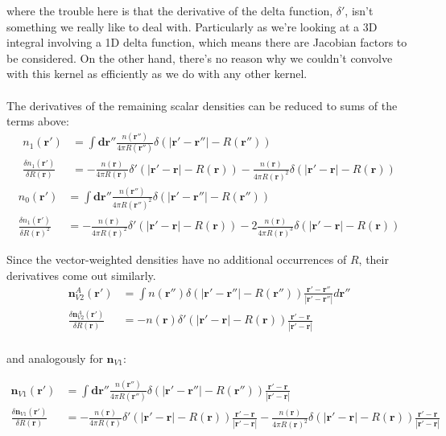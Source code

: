 \documentclass[letterpaper,twocolumn,amsmath,amssymb,jcp,10pt,aip]{revtex4-1}
\begin{document}
\begin{widetext}
where the trouble here is that the derivative of the delta function,
$\delta'$, isn't something we really like to deal with.  Particularly
as we're looking  at a 3D integral involving a 1D delta function,
which means there are Jacobian factors to be considered.  On the other
hand, there's no reason why we couldn't convolve with this kernel as
efficiently as we do with any other kernel.
\\
\\
The derivatives of the remaining scalar densities can be reduced to
sums of the terms above:
\begin{align}
  n_1(\mathbf{r}') &= \int \mathbf{dr''} \frac{n(\mathbf{r''})}{4\pi R(\mathbf{r''})}
  \delta(|\mathbf{r'}-\mathbf{r''}| - R(\mathbf{r''})) \\
  \frac{\delta n_1(\mathbf{r}')}{\delta R(\mathbf{r})}
  &= -\frac{n(\mathbf{r})}{4\pi
    R(\mathbf{r})}\delta'(|\mathbf{r'}-\mathbf{r}| - R(\mathbf{r}))
  -
  \frac{n(\mathbf{r})}{4\pi
    R(\mathbf{r})^2}\delta(|\mathbf{r'}-\mathbf{r}| - R(\mathbf{r}))
\end{align}
\begin{align}
  n_0(\mathbf{r}') &= \int \mathbf{dr''} \frac{n(\mathbf{r''})}{4\pi R(\mathbf{r''})^2}
  \delta(|\mathbf{r'}-\mathbf{r''}| - R(\mathbf{r''})) \\
  \frac{\delta n_1(\mathbf{r}')}{\delta R(\mathbf{r})^2}
  &= -\frac{n(\mathbf{r})}{4\pi
    R(\mathbf{r})^2}\delta'(|\mathbf{r'}-\mathbf{r}| - R(\mathbf{r}))
  -
  2\frac{n(\mathbf{r})}{4\pi
    R(\mathbf{r})^3}\delta(|\mathbf{r'}-\mathbf{r}| - R(\mathbf{r}))
\end{align}

Since the vector-weighted densities have no additional occurrences of
$R$, their derivatives come out similarly.
\begin{align}
  \mathbf{n}_{V2}^{A}(\mathbf{r}') &= \int n(\mathbf{r}'') \delta(|\mathbf{r}' - \mathbf{r}''| - R(\mathbf{r}'')) 
    \frac{\mathbf{r'}-\mathbf{r''}}{|\mathbf{r'}-\mathbf{r''}|} d \mathbf{r}''\\
  \frac{\delta \mathbf{n}_{V2}^{A}(\mathbf{r}')}{\delta R(\mathbf{r})} &= - n(\mathbf{r}) \delta'(|\mathbf{r}' - \mathbf{r}| - R(\mathbf{r}))
    \frac{\mathbf{r}'-\mathbf{r}}{|\mathbf{r}'-\mathbf{r}|}\\
\end{align}

and analogously for $\mathbf{n}_{V1}$:

\begin{align}
  \mathbf{n}_{V1}(\mathbf{r}') &= \int \mathbf{dr''} \frac{n(\mathbf{r''})}{4\pi R(\mathbf{r''})}
  \delta(|\mathbf{r'}-\mathbf{r''}| - R(\mathbf{r''})) \frac{\mathbf{r'}-\mathbf{r}}{|\mathbf{r'}-\mathbf{r}|}\\
  \frac{\delta \mathbf{n}_{V1}(\mathbf{r}')}{\delta R(\mathbf{r})}
  &= -\frac{n(\mathbf{r})}{4\pi
    R(\mathbf{r})}\delta'(|\mathbf{r'}-\mathbf{r}| - R(\mathbf{r})) \frac{\mathbf{r'}-\mathbf{r}}{|\mathbf{r'}-\mathbf{r}|}
  -
  \frac{n(\mathbf{r})}{4\pi
    R(\mathbf{r})^2}\delta(|\mathbf{r'}-\mathbf{r}| - R(\mathbf{r})) \frac{\mathbf{r'}-\mathbf{r}}{|\mathbf{r'}-\mathbf{r}|}  
\end{align}


\end{widetext}
\end{document}
